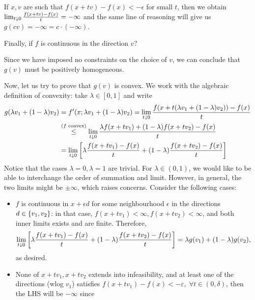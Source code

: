 \documentclass[10pt]{article}
\begin{document}
\begin{Exercise}
\begin{enumerate}
			If $x, v$ are such that $f(x + tv) - f(x) < -\epsilon$ for small
			$t$, then we obtain $\lim_{t \downarrow 0} \frac{f(x + tv) - f(x)}{t} =
			-\infty$ and the same line of reasoning will give us
			\( g(cv) = -\infty = c \cdot (-\infty) \).

			Finally, if $f$ is continuous in the direction $v$?
	\end{enumerate}
	Since we have imposed no constraints on the choice of $v$, we can conclude
	that $g(v)$ must be positively homogeneous.

	Now, let us try to prove that $g(v)$ is convex. We work with the algebraic
	definition of convexity: take $\lambda \in [0, 1]$ and write
	\begin{align*}
		g(\lambda v_1 +( 1 - \lambda )v_2) &= f'(x; \lambda v_1 + (1 - \lambda)
		v_2) = \lim_{t \downarrow 0} \frac{f(x + t (\lambda v_1 + (1 - \lambda)
		v_2)) - f(x)}{t} \\
            &\overset{(\text{$f$ convex})}{\leq} \lim_{t \downarrow 0}
                \frac{\lambda f(x + t v_1) + (1 - \lambda) f(x + t v_2)
                    - f(x)}{t} \\
            &= \lim_{t \downarrow 0} \left[ \lambda \frac{f(x + t v_1) - f(x)}{t}
             + (1 - \lambda) \frac{f(x + t v_2) - f(x)}{t} \right]
	\end{align*}
    Notice that the cases $\lambda = 0, \lambda = 1$ are trivial.
    For $\lambda \in (0, 1)$, we would like to be able to interchange the order
    of summation and limit. However, in general, the two limits might be $\pm
    \infty$, which raises concerns. Consider the following cases:
    \begin{itemize}
    \item $f$ is continuous in $x + \epsilon d$ for some neighbourhood
    $\epsilon$ in the directions $d \in \left\{ v_1, v_2 \right\}$: in that case, $f(x + t
    v_1) < \infty, f(x + tv_2) < \infty$, and both inner limits exists and are
    finite. 
    Therefore,
    \[
        \lim_{t \downarrow 0} \left[ \lambda \frac{f(x + tv_1) - f(x)}{t}
        + (1 - \lambda )\frac{f(x + tv_2) - f(x)}{t}\right]
        = \lambda g(v_1) + (1 - \lambda) g(v_2),
    \]
    as desired.
    \item None of $x + tv_1, x + tv_2$ extends into infeasibility, and at least
        one of the directions (wlog $v_1$) satisfies $f(x + tv_1) - f(x) <
        -\varepsilon, \; \forall t \in (0, \delta)$, then the LHS will be
        $-\infty$ since

\end{itemize}
\end{Exercise}
\end{document}
